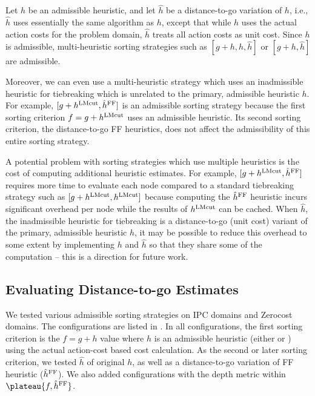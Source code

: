 Let $h$ be an admissible heuristic, and
let $\hat{h}$ be a distance-to-go variation of $h$, i.e., $\hat{h}$ uses essentially the same algorithm as $h$, except that while $h$ uses the actual action costs for the problem domain, $\hat{h}$ treats all action costs as unit cost.
Since $h$ is admissible, multi-heuristic sorting strategies such as $[g+h,h,\hat{h}]$ or $[g+h,\hat{h}]$
are admissible.

Moreover, we can even use a multi-heuristic strategy which uses an inadmissible heuristic for tiebreaking which is unrelated to the primary, admissible heuristic $h$.
 For example, $[g+h^{\text{LMcut}},\hat{h}^{\text{FF}}]$ is an admissible sorting strategy
because the first sorting criterion $f=g+h^{\text{LMcut}}$ uses an admissible
\lmcut heuristic. Its second sorting criterion, the distance-to-go FF
heuristics, does not affect the admissibility of this entire sorting strategy.

A potential problem with sorting strategies which use multiple heuristics is the cost of computing additional
heuristic estimates. For example, $[g+h^{\text{LMcut}},\hat{h}^{\text{FF}}]$ requires more time to evaluate each node compared to a standard tiebreaking strategy such as $[g+h^{\text{LMcut}},h^{\text{LMcut}}]$ because computing the $\hat{h}^{\text{FF}}$ heuristic incurs significant overhead per node while the results of $h^{\text{LMcut}}$ can be cached.
When $\hat{h}$, the inadmissible heuristic for tiebreaking is a distance-to-go (unit cost) variant of the primary, admissible heuristic $h$, it may be possible to reduce this overhead to some extent by implementing $h$ and $\hat{h}$ so that they share some of the computation  -- this is a direction for future work.

\subsection{Evaluating Distance-to-go Estimates}

We tested various admissible sorting strategies on IPC domains and Zerocost domains.
The configurations are listed in . 
In all configurations, the first sorting criterion is the $f=g+h$ value
where $h$ is an admissible heuristic (either \lmcut or \mands) using the actual action-cost based  cost calculation.
As the second or later sorting criterion,
we tested $\hat{h}$ of original $h$, as well as a distance-to-go variation of FF
heuristic ($\hat{h}^{\text{FF}}$).
We also added configurations with the depth metric within
$\plateau{f,\hat{h}^{\text{\ff}}}$.

